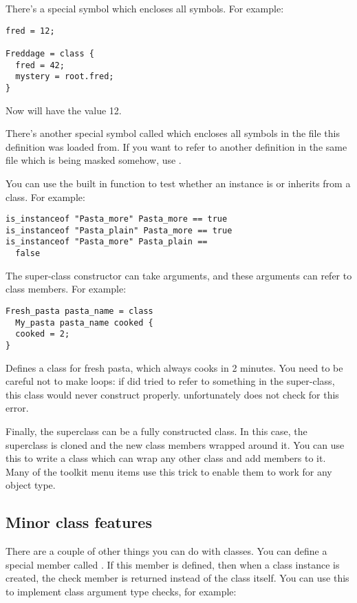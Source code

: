 There's a special symbol  which encloses all symbols. For
example:

\begin{verbatim}
fred = 12; 

Freddage = class { 
  fred = 42;
  mystery = root.fred;
}
\end{verbatim}

\noindent
Now  will have the value 12.

There's another special symbol called  which encloses all symbols in
the file this definition was loaded from. If you want to refer to another
definition in the same file which is being masked somehow, use .

You can use the built in function  to test whether an
instance is or inherits from a class. For example:

\begin{verbatim}
is_instanceof "Pasta_more" Pasta_more == true
is_instanceof "Pasta_plain" Pasta_more == true
is_instanceof "Pasta_more" Pasta_plain ==
  false
\end{verbatim}

The super-class constructor can take arguments, and these arguments can refer
to class members. For example:

\begin{verbatim}
Fresh_pasta pasta_name = class
  My_pasta pasta_name cooked {
  cooked = 2;
}
\end{verbatim}

\noindent
Defines a class for fresh pasta, which always cooks in 2 minutes. You need to
be careful not to make loops: if  did tried to refer to
something in the super-class, this class would never construct properly.
\nip{} unfortunately does not check for this error.

Finally, the superclass can be a fully constructed class. In this case, the
superclass is cloned and the new class members wrapped around it. You can use
this to write a class which can wrap any other class and add members to it.
Many of the toolkit menu items use this trick to enable them to work for any
object type.

\subsection{Minor class features}

There are a couple of other things you can do with classes. You can define a
special member called . If this member is defined, then when a
class instance is created, the check member is returned instead of the class
itself. You can use this to implement class argument type checks, for example:


